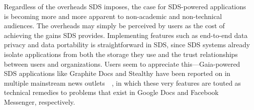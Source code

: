 Regardless of the overheads SDS imposes, the case for SDS-powered applications is becoming more and more apparent to 
non-academic and non-technical audiences.  The overheads may simply be 
perceived by users as the cost of achieving the gains SDS provides.  Implementing features such as
end-to-end data privacy and data portability is straightforward in SDS, since
SDS systems already isolate applications from both the storage they use and the
trust relationships between users and organizations.  Users seem to appreciate
this---Gaia-powered SDS
applications like Graphite Docs and Stealthy have been reported on in
multiple mainstream news outlets~\cite{graphite-wired}~\cite{washington-post-blockstack}, in
which these very features are touted as technical remedies to problems that
exist in Google Docs and Facebook Messenger, respectively.
